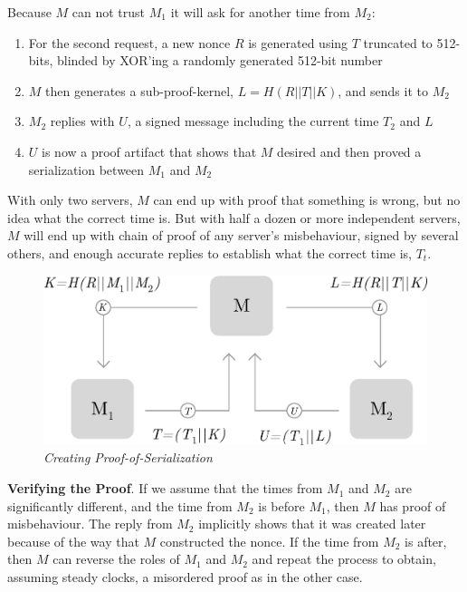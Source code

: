 \documentclass[10pt, nonatbib, nocopyrightspace, reprint]{sigplanconf}
\begin{document}
Because $M$ can not trust $M_1$ it will ask for another time from $M_2$:

\begin{enumerate}
        \item For the second request, a new nonce $R$ is generated using $T$ truncated to 512-bits, blinded by XOR'ing a randomly generated 512-bit number
        \item $M$ then generates a sub-proof-kernel, $L = H\left(R || T || K\right)$, and sends it to $M_2$
        \item $M_2$ replies with $U$, a signed message including the current time $T_2$ and $L$
        \item $U$ is now a proof artifact that shows that $M$ desired and then proved a serialization between $M_1$ and $M_2$
\end{enumerate}

With only two servers, $M$ can end up with proof that something is wrong, but no idea what the correct time is. But with half a dozen or more independent servers, $M$ will end up with chain of proof of any server's misbehaviour, signed by several others, and enough accurate replies to establish what the correct time is, $T_t$.

\begin{figure}[H]
    \begin{center}
          \includegraphics[width=\columnwidth]{serialization.eps}
          \caption{\emph{Creating Proof-of-Serialization}}
          \label{fig:serialization}
     \end{center}
\end{figure}

\textbf{Verifying the Proof}. If we assume that the times from $M_1$ and $M_2$ are significantly different, and the time from $M_2$ is before $M_1$, then $M$ has proof of misbehaviour. The reply from $M_2$ implicitly shows that it was created later because of the way that $M$ constructed the nonce. If the time from $M_2$ is after, then $M$ can reverse the roles of $M_1$ and $M_2$ and repeat the process to obtain, assuming steady clocks, a misordered proof as in the other case.
\end{document}
